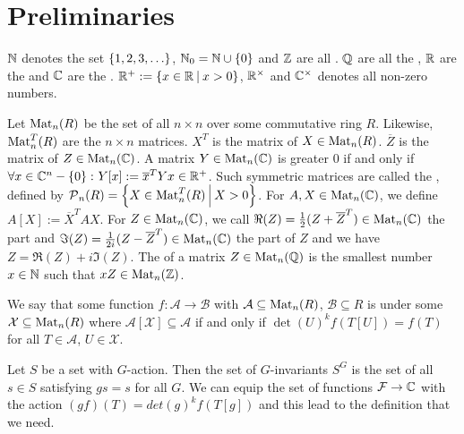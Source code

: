 

\section{Preliminaries}

$\mathbb{N}$ denotes the set $\Set{1,2,3,\dots}$, $\N_0 = \N \cup \Set{0}$ and $\mathbb{Z}$ are all . $\mathbb{Q}$ are all the , $\mathbb{R}$ are the  and $\mathbb{C}$ are the . $\R^+ := \Set{x\in\R}{x>0}$, $\mathbb{R}^\times$ and $\mathbb{C}^\times$ denotes all non-zero numbers.

Let $\operatorname{Mat}_n(R)$ be the set of all $n \times n$  over some commutative ring $R$.
Likewise, $\operatorname{Mat}_n^T(R)$ are the  $n \times n$ matrices.
$X^T$ is the  matrix of $X \in \operatorname{Mat}_n(R)$.
$\overline{Z}$ is the  matrix of $Z \in \operatorname{Mat}_n(\mathbb{C})$.
A matrix $Y \in \operatorname{Mat}_n(\mathbb{C})$ is greater $0$ if and only if $\forall x \in \C^n - \Set{0} \colon Y[x] := \overline{x}^{T} Y x \in \R^+$. Such symmetric matrices are called the , defined by $\PM_n(R) = \Set{X \in \M^T_n(R)}{X > 0}$. For $A,X \in \operatorname{Mat}_n(\mathbb{C})$, we define $A[X] := \overline{X}^T A X$. For $Z \in \operatorname{Mat}_n(\mathbb{C})$, we call $\Re(Z) = \frac{1}{2} (Z + \overline{Z}^{T}) \in \operatorname{Mat}_n(\mathbb{C})$ the  part and $\Im(Z) = \frac{1}{2i} (Z - \overline{Z}^{T})  \in \operatorname{Mat}_n(\mathbb{C})$ the  part of $Z$ and we have $Z = \Re(Z) + i \Im(Z)$. The  of a matrix $Z \in \operatorname{Mat}_n(\mathbb{Q})$ is the smallest number $x \in \mathbb{N}$ such that $x Z \in \operatorname{Mat}_n(\mathbb{Z})$.

We say that some function $f \colon \mathcal{A} \rightarrow \mathcal{B}$ with $\mathcal{A} \subseteq \operatorname{Mat}_n(R)$, $\mathcal{B} \subseteq R$ is  under some $\mathcal{X} \subseteq \operatorname{Mat}_n(R)$ where $\mathcal{A}[\mathcal{X}] \subseteq \mathcal{A}$ if and only if $\det(U)^k f(T[U]) = f(T)$ for all $T \in \mathcal{A}$, $U \in \mathcal{X}$.

Let $S$ be a set with $G$-action. Then the set of $G$-invariants $S^G$ is the set of all $s \in S$ satisfying $g s = s$ for all $G$.  We can equip the set of functions $\mathcal{F} \rightarrow \mathbb{C}$ with the action
$( g f ) (T) = det(g)^k f( T[g] )$  %
and this lead to the definition that we need.

